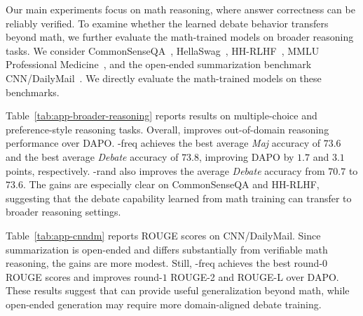 Our main experiments focus on math reasoning, where answer correctness can be reliably verified. To examine whether the learned debate behavior transfers beyond math, we further evaluate the math-trained models on broader reasoning tasks. We consider CommonSenseQA~\citep{talmor2019commonsenseqa}, HellaSwag~\citep{zellers2019hellaswag}, HH-RLHF~\cite{bai2022training}, MMLU Professional Medicine~\cite{hendrycks2020measuring}, and the open-ended summarization benchmark CNN/DailyMail~\cite{see2017get}. We directly evaluate the math-trained models on these benchmarks.

Table~\ref{tab:app-broader-reasoning} reports results on multiple-choice and preference-style reasoning tasks. Overall, \SDRL{} improves out-of-domain reasoning performance over DAPO. \SDRL{}-freq achieves the best average \textit{Maj} accuracy of $73.6$ and the best average \textit{Debate} accuracy of $73.8$, improving DAPO by $1.7$ and $3.1$ points, respectively. \SDRL{}-rand also improves the average \textit{Debate} accuracy from $70.7$ to $73.6$. The gains are especially clear on CommonSenseQA and HH-RLHF, suggesting that the debate capability learned from math training can transfer to broader reasoning settings.

Table~\ref{tab:app-cnndm} reports ROUGE scores on CNN/DailyMail. Since summarization is open-ended and differs substantially from verifiable math reasoning, the gains are more modest. Still, \SDRL{}-freq achieves the best round-$0$ ROUGE scores and improves round-$1$ ROUGE-2 and ROUGE-L over DAPO. These results suggest that \SDRL{} can provide useful generalization beyond math, while open-ended generation may require more domain-aligned debate training.

